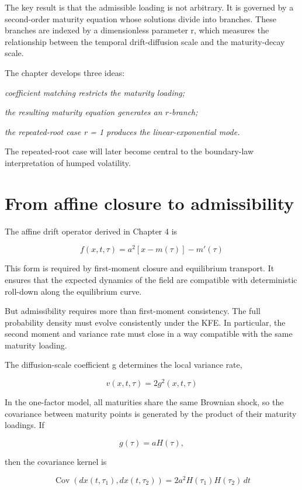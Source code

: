 \documentclass[11pt,oneside]{book}
\begin{document}
The key result is that the admissible loading is not arbitrary. It is
governed by a second-order maturity equation whose solutions divide into
branches. These branches are indexed by a dimensionless parameter r,
which measures the relationship between the temporal drift-diffusion
scale and the maturity-decay scale.

The chapter develops three ideas:

\begin{center}\emph{coefficient matching restricts the maturity loading;}\end{center}
\begin{center}\emph{the resulting maturity equation generates an \(r\)-branch;}\end{center}
\emph{the repeated-root case r = 1 produces the linear-exponential
mode.}

The repeated-root case will later become central to the boundary-law
interpretation of humped volatility.

\section{From affine closure to admissibility}

The affine drift operator derived in Chapter 4 is

\[
f(x,t,\tau) = a^2[x - m(\tau)] - m'(\tau)
\]

This form is required by first-moment closure and equilibrium transport.
It ensures that the expected dynamics of the field are compatible with
deterministic roll-down along the equilibrium curve.

But admissibility requires more than first-moment consistency. The full
probability density must evolve consistently under the KFE. In
particular, the second moment and variance rate must close in a way
compatible with the same maturity loading.

The diffusion-scale coefficient g determines the local variance rate,

\[
v(x,t,\tau) = 2g^2(x,t,\tau)
\]

In the one-factor model, all maturities share the same Brownian shock,
so the covariance between maturity points is generated by the product of
their maturity loadings. If

\[
g(\tau) = aH(\tau),
\]

then the covariance kernel is

\[
\operatorname{Cov}(dx(t,\tau_1), dx(t,\tau_2)) = 2a^2H(\tau_1)H(\tau_2)\,dt
\]
\end{document}
